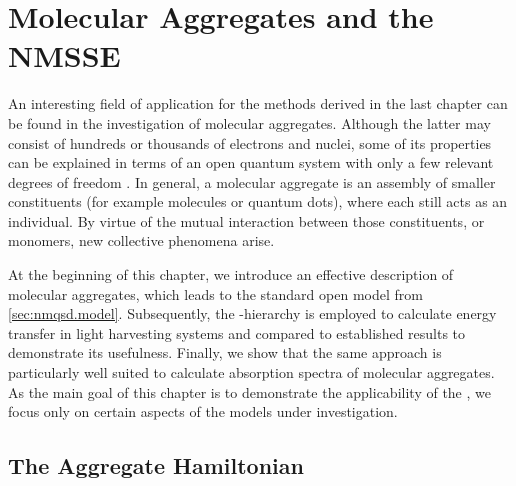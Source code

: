 \chapter{Molecular Aggregates and the NMSSE}
\label{chap:app}
%


An interesting field of application for the methods derived in the last chapter can be found in the investigation of molecular aggregates.
Although the latter may consist of hundreds or thousands of electrons and nuclei, some of its properties can be explained in terms of an open quantum system with only a few relevant degrees of freedom \cite{MaKu11_dynamics}.
In general, a molecular aggregate is an assembly of smaller constituents (for example molecules or quantum dots), where each still acts as an individual.
By virtue of the mutual interaction between those constituents, or monomers, new collective phenomena arise.

At the beginning of this chapter, we introduce an effective description of molecular aggregates, which leads to the standard open model from \autoref{sec:nmqsd.model}.
Subsequently, the \NMSSE-hierarchy is employed to calculate energy transfer in light harvesting systems and compared to established results to demonstrate its usefulness.
Finally, we show that the same approach is particularly well suited to calculate absorption spectra of molecular aggregates.
As the main goal of this chapter is to demonstrate the applicability of the \NMSSE, we focus only on certain aspects of the models under investigation.

\section{The Aggregate Hamiltonian}
\label{sec:app.model}
%

